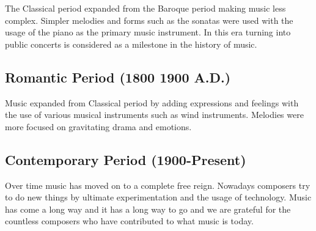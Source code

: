 The Classical period expanded from the Baroque period making music less complex. Simpler melodies 
and forms such as the sonatas were used with the usage of the piano as the primary music instrument. 
In this era turning into public concerts is considered as a milestone in the history of music.

\subsection{Romantic Period (1800 1900 A.D.)}

Music expanded from Classical period by adding expressions and feelings with the use of various musical 
instruments such as wind instruments. Melodies were more focused on gravitating drama and emotions.

\subsection{Contemporary Period (1900-Present)}

Over time music has moved on to a complete free reign. Nowadays composers  try to do new things by 
ultimate experimentation and the usage of technology.  Music has come a long way and it has a long 
way to go and we are grateful for the countless composers who have contributed to what music is today.